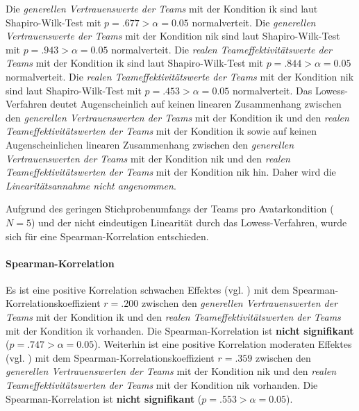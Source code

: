 \documentclass[a4paper,11pt]{article}%
\renewcommand{\\}{\vspace*{0.5\baselineskip} \newline}
\begin{document}
%
Die \textit{generellen Vertrauenswerte der Teams} mit der Kondition \ac{ik} sind laut Shapiro-Wilk-Test mit $p = .677 > \alpha = 0.05$ normalverteit. \newline
Die \textit{generellen Vertrauenswerte der Teams} mit der Kondition \ac{nik} sind laut Shapiro-Wilk-Test mit $p = .943 > \alpha = 0.05$ normalverteit. \newline
Die \textit{realen Teameffektivitätswerte der Teams} mit der Kondition \ac{ik} sind laut Shapiro-Wilk-Test mit $p = .844 > \alpha = 0.05$ normalverteit. \newline
Die \textit{realen Teameffektivitätswerte der Teams} mit der Kondition \ac{nik} sind laut Shapiro-Wilk-Test mit $p = .453 > \alpha = 0.05$ normalverteit. \\
Das Lowess-Verfahren deutet Augenscheinlich auf keinen linearen Zusammenhang zwischen den \textit{generellen Vertrauenswerten der Teams} mit der Kondition \ac{ik} und den \textit{realen Teameffektivitätswerten der Teams} mit der Kondition \ac{ik} sowie auf keinen Augenscheinlichen linearen Zusammenhang zwischen den \textit{generellen Vertrauenswerten der Teams} mit der Kondition \ac{nik} und den \textit{realen Teameffektivitätswerten der Teams} mit der Kondition \ac{nik} hin. Daher wird die \textit{Linearitätsannahme nicht angenommen}.

Aufgrund des geringen Stichprobenumfangs der Teams pro Avatarkondition ($N=5$) und der nicht eindeutigen Linearität durch das Lowess-Verfahren, wurde sich für eine Spearman-Korrelation entschieden.

\paragraph{Spearman-Korrelation}
Es ist eine positive Korrelation schwachen Effektes (vgl. \citep{cohen2013statistical}) mit dem Spearman-Korrelationskoeffizient $r = .200$ zwischen den \textit{generellen Vertrauenswerten der Teams} mit der Kondition \ac{ik} und den \textit{realen Teameffektivitätswerten der Teams} mit der Kondition \ac{ik} vorhanden. Die Spearman-Korrelation ist \textbf{nicht signifikant} ($p = .747 > \alpha = 0.05$).\\
Weiterhin ist eine positive Korrelation moderaten Effektes (vgl. \citep{cohen2013statistical}) mit dem Spearman-Korrelationskoeffizient $r = .359$ zwischen den \textit{generellen Vertrauenswerten der Teams} mit der Kondition \ac{nik} und den \textit{realen Teameffektivitätswerten der Teams} mit der Kondition \ac{nik} vorhanden. Die Spearman-Korrelation ist \textbf{nicht signifikant} ($p = .553 > \alpha = 0.05$).
\end{document}

